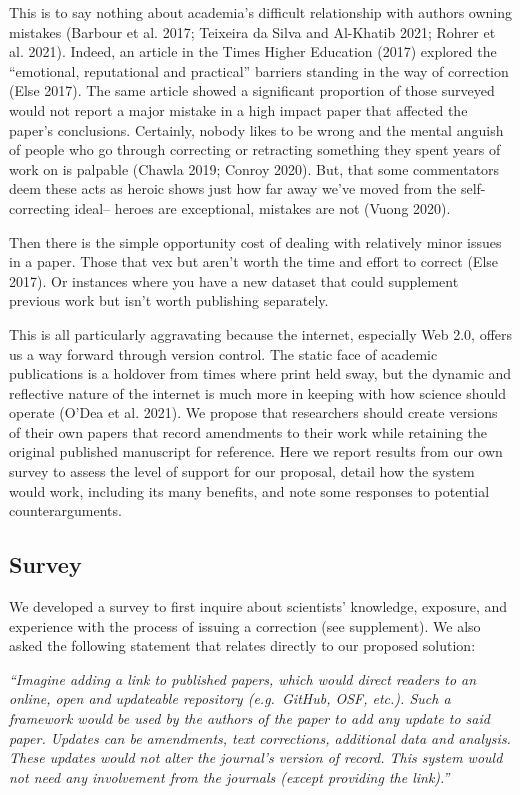 \documentclass[
]{article}
\begin{document}
This is to say nothing about academia's difficult relationship with
authors owning mistakes (Barbour et al. 2017; Teixeira da Silva and
Al-Khatib 2021; Rohrer et al. 2021). Indeed, an article in the Times
Higher Education (2017) explored the ``emotional, reputational and
practical'' barriers standing in the way of correction (Else 2017). The
same article showed a significant proportion of those surveyed would not
report a major mistake in a high impact paper that affected the paper's
conclusions. Certainly, nobody likes to be wrong and the mental anguish
of people who go through correcting or retracting something they spent
years of work on is palpable (Chawla 2019; Conroy 2020). But, that some
commentators deem these acts as heroic shows just how far away we've
moved from the self-correcting ideal-- heroes are exceptional, mistakes
are not (Vuong 2020).

Then there is the simple opportunity cost of dealing with relatively
minor issues in a paper. Those that vex but aren't worth the time and
effort to correct (Else 2017). Or instances where you have a new dataset
that could supplement previous work but isn't worth publishing
separately.

This is all particularly aggravating because the internet, especially
Web 2.0, offers us a way forward through version control. The static
face of academic publications is a holdover from times where print held
sway, but the dynamic and reflective nature of the internet is much more
in keeping with how science should operate (O'Dea et al. 2021). We
propose that researchers should create versions of their own papers that
record amendments to their work while retaining the original published
manuscript for reference. Here we report results from our own survey to
assess the level of support for our proposal, detail how the system
would work, including its many benefits, and note some responses to
potential counterarguments.

\hypertarget{survey}{%
\subsection{Survey}\label{survey}}

We developed a survey to first inquire about scientists' knowledge,
exposure, and experience with the process of issuing a correction (see
supplement). We also asked the following statement that relates directly
to our proposed solution:

\emph{``Imagine adding a link to published papers, which would direct
readers to an online, open and updateable repository (e.g.~GitHub, OSF,
etc.). Such a framework would be used by the authors of the paper to add
any update to said paper. Updates can be amendments, text corrections,
additional data and analysis. These updates would not alter the
journal's version of record. This system would not need any involvement
from the journals (except providing the link).''}
\end{document}

